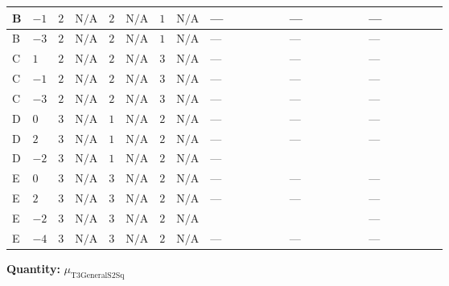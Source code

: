 \documentclass[8pt]{article}
\begin{document}
\begin{landscape}
\begin{longtable}{@{}llcccccc >{\raggedright\arraybackslash}p{0.21\linewidth} >{\raggedright\arraybackslash}p{0.21\linewidth} >{\raggedright\arraybackslash}p{0.21\linewidth}@{}}
\midrule
B & $-1$ & $2$ & $\text{N/A}$ & $2$ & $\text{N/A}$ & $1$ & $\text{N/A}$ & --- & --- & --- \\
\midrule
B & $-3$ & $2$ & $\text{N/A}$ & $2$ & $\text{N/A}$ & $1$ & $\text{N/A}$ & --- & --- & --- \\
\midrule
C & $1$ & $2$ & $\text{N/A}$ & $2$ & $\text{N/A}$ & $3$ & $\text{N/A}$ & --- & --- & --- \\
\midrule
C & $-1$ & $2$ & $\text{N/A}$ & $2$ & $\text{N/A}$ & $3$ & $\text{N/A}$ & --- & --- & --- \\
\midrule
C & $-3$ & $2$ & $\text{N/A}$ & $2$ & $\text{N/A}$ & $3$ & $\text{N/A}$ & --- & --- & --- \\
\midrule
D & $0$ & $3$ & $\text{N/A}$ & $1$ & $\text{N/A}$ & $2$ & $\text{N/A}$ & --- & --- & --- \\
\midrule
D & $2$ & $3$ & $\text{N/A}$ & $1$ & $\text{N/A}$ & $2$ & $\text{N/A}$ & --- & --- & --- \\
\midrule
D & $-2$ & $3$ & $\text{N/A}$ & $1$ & $\text{N/A}$ & $2$ & $\text{N/A}$ & --- & \scriptsize\adjustbox{max width=\linewidth}{$\begin{gathered} +6 {\lambda_{X_{2}}} {m_2^2}\end{gathered}$} & \scriptsize\adjustbox{max width=\linewidth}{$\begin{gathered} +6 {\lambda_{X_{7}}^{(1)}} {m_1^2}\end{gathered}$} \\
\midrule
E & $0$ & $3$ & $\text{N/A}$ & $3$ & $\text{N/A}$ & $2$ & $\text{N/A}$ & --- & --- & --- \\
\midrule
E & $2$ & $3$ & $\text{N/A}$ & $3$ & $\text{N/A}$ & $2$ & $\text{N/A}$ & --- & --- & --- \\
\midrule
E & $-2$ & $3$ & $\text{N/A}$ & $3$ & $\text{N/A}$ & $2$ & $\text{N/A}$ & \scriptsize\adjustbox{max width=\linewidth}{$\begin{gathered} -4 {\lambda_{S_2}^{(A)}} {\mu_{\mathrm{T3GeneralS2Sq}}}\end{gathered}$} & \scriptsize\adjustbox{max width=\linewidth}{$\begin{gathered} +10 {\lambda_{X_{2}}} {m_2^2}\end{gathered}$} & --- \\
\midrule
E & $-4$ & $3$ & $\text{N/A}$ & $3$ & $\text{N/A}$ & $2$ & $\text{N/A}$ & --- & --- & --- \\
\midrule
\bottomrule
\end{longtable}
\clearpage
\noindent\textbf{Quantity: }${\mu_{\mathrm{T3GeneralS2Sq}}}$\par\smallskip

\end{landscape}
\end{document}
